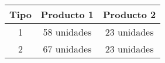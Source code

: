 \documentclass[12pt]{article}
\begin{document}
\begin{table}[ht]
\centering
\caption{}
\label{tab:my-table}
\begin{tabular}{@{}ccc@{}}
\toprule
\rowcolor[HTML]{EFEFEF} 
{\color[HTML]{CB0000} \textbf{Tipo}} & {\color[HTML]{CB0000} \textbf{Producto 1}} & {\color[HTML]{CB0000} \textbf{Producto 2}} \\ \midrule
1 & 58 unidades & 23 unidades \\
2 & 67 unidades & 23 unidades \\ \bottomrule
\end{tabular}
\end{table}
\end{document}
